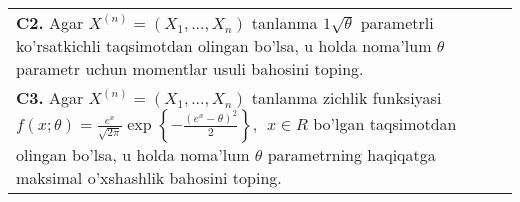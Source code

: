 \documentclass{article}
\begin{document}
\begin{tabular}{m{17cm}}
\\
\textbf{C2.} 
Agar \(X^{(n)} = \left( X_{1},...,X_{n} \right)\) tanlanma \(1\sqrt{\theta}\) parametrli ko'rsatkichli taqsimotdan olingan bo'lsa, u holda noma'lum \(\theta\) parametr uchun momentlar usuli bahosini toping.
\\
\textbf{C3.} 
Agar \(X^{(n)} = \left( X_{1},...,X_{n} \right)\) tanlanma zichlik funksiyasi \(f(x;\theta) = \frac{e^{x}}{\sqrt{2\pi}}\exp\left\{ - \frac{\left( e^{x} - \theta \right)^{2}}{2} \right\},\ \ x \in R\) bo'lgan taqsimotdan olingan bo'lsa, u holda noma'lum \(\theta\) parametrning haqiqatga maksimal o'xshashlik bahosini toping.
\\

\end{tabular}
\vspace{1cm}
\end{document}
